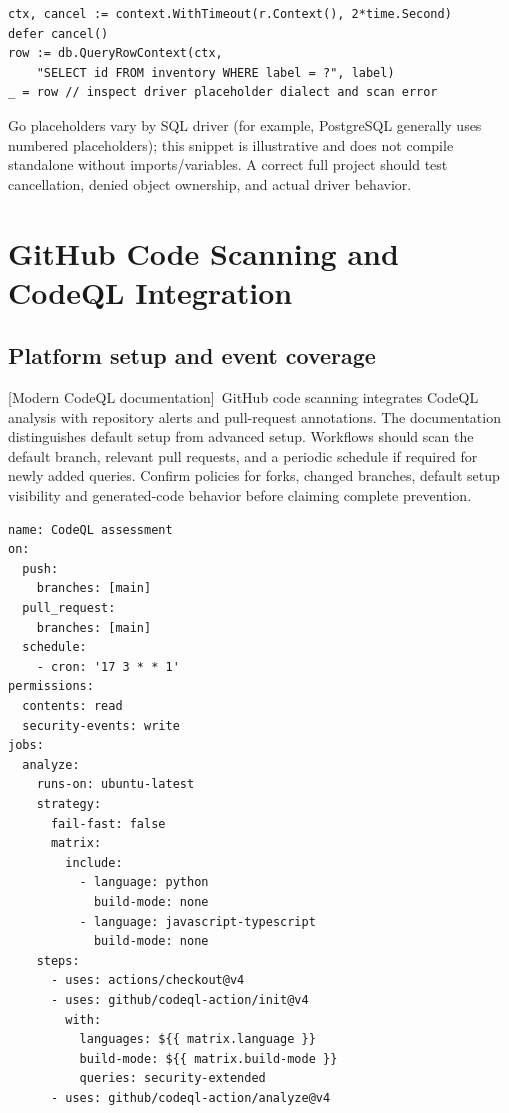 \documentclass[11pt,letterpaper,oneside]{book}
\newcommand{\srcM}{\textsf{[Modern CodeQL documentation]}}
\begin{document}
\begin{lstlisting}[caption={Go: context-bounded parameterized query skeleton}]
ctx, cancel := context.WithTimeout(r.Context(), 2*time.Second)
defer cancel()
row := db.QueryRowContext(ctx,
    "SELECT id FROM inventory WHERE label = ?", label)
_ = row // inspect driver placeholder dialect and scan error
\end{lstlisting}

Go placeholders vary by SQL driver (for example, PostgreSQL generally uses numbered placeholders); this snippet is illustrative and does not compile standalone without imports/variables. A correct full project should test cancellation, denied object ownership, and actual driver behavior.

\chapter{GitHub Code Scanning and CodeQL Integration}

\section{Platform setup and event coverage}

\srcM\ GitHub code scanning integrates CodeQL analysis with repository alerts and pull-request annotations. The documentation distinguishes default setup from advanced setup. Workflows should scan the default branch, relevant pull requests, and a periodic schedule if required for newly added queries. Confirm policies for forks, changed branches, default setup visibility and generated-code behavior before claiming complete prevention.

\begin{lstlisting}[caption={Illustrative GitHub Actions advanced setup (adapt to repo)}]
name: CodeQL assessment
on:
  push:
    branches: [main]
  pull_request:
    branches: [main]
  schedule:
    - cron: '17 3 * * 1'
permissions:
  contents: read
  security-events: write
jobs:
  analyze:
    runs-on: ubuntu-latest
    strategy:
      fail-fast: false
      matrix:
        include:
          - language: python
            build-mode: none
          - language: javascript-typescript
            build-mode: none
    steps:
      - uses: actions/checkout@v4
      - uses: github/codeql-action/init@v4
        with:
          languages: ${{ matrix.language }}
          build-mode: ${{ matrix.build-mode }}
          queries: security-extended
      - uses: github/codeql-action/analyze@v4
\end{lstlisting}
\end{document}
